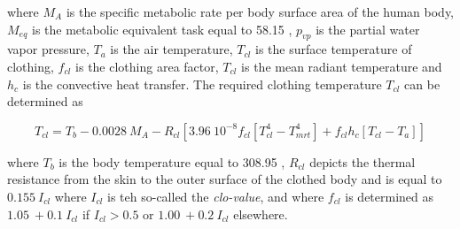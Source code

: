where $M_{A}$ is the specific metabolic rate per body surface area of the human body, $M_{eq}$ is the metabolic equivalent task equal to 58.15 \watt\rpsquare\metre, $p_{vp}$ is the partial water vapor pressure, $T_{a}$ is the air temperature, $T_{cl}$ is the surface temperature of clothing, $f_{cl}$ is the clothing area factor, $T_{cl}$ is the mean radiant temperature and $h_{c}$ is the convective heat transfer. The required clothing temperature $T_{cl}$ can be determined as

\begin{dmath}
T_{cl} = T_{b} - 0.0028\ M_{A} - R_{cl} \left[ 3.96\ 10^{-8} f_{cl} \left[ T_{cl}^{4} - T_{mrt}^{4} \right] + f_{cl} h_{c} \left[ T_{cl} - T_{a} \right] \right]
\end{dmath}

where $T_{b}$ is the body temperature equal to 308.95 \kelvin, $R_{cl}$ depicts the thermal resistance from the skin to the outer surface of the clothed body and is equal to $0.155\ I_{cl}$ where $I_{cl}$ is teh so-called the \emph{clo-value}, and where $f_{cl}$ is determined as $1.05\ + 0.1\ I_{cl}$ if $I_{cl} > 0.5$ or $1.00\ + 0.2\ I_{cl}$ elsewhere.


%






